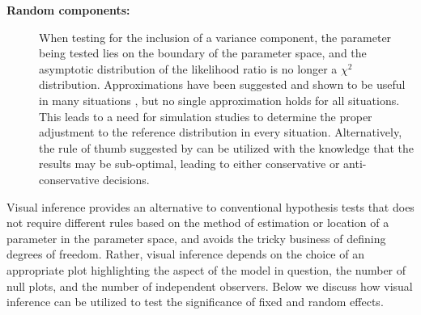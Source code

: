 \documentclass[12pt]{article} %
\newcommand{\alnote}[1]{\todo[inline,color=green!40]{#1}} %
\newcommand{\hhnote}[1]{\todo[inline,color=orange!40]{#1}}
\begin{document}
\begin{description}
%
\item[\bf Random components: ] When testing for the inclusion of a variance component, the parameter being tested lies on the boundary of the parameter space, and the asymptotic distribution of the likelihood ratio is no longer a $\chi^2$ distribution. Approximations have been suggested and shown to be useful in many situations \citep{Stram:1994wd, Morrell:1998ua}, but no single approximation holds for all situations. This leads to a need for simulation studies to determine the proper adjustment to the reference distribution in every situation. Alternatively, the rule of thumb suggested by \citeauthor{Stram:1994wd} can be utilized with the knowledge that the results may be sub-optimal, leading to either conservative or anti-conservative decisions. 
\end{description}


Visual inference provides an alternative to conventional hypothesis tests that does not require different rules based on the method of estimation or location of a parameter in the parameter space, and avoids the tricky business of defining degrees of freedom. Rather, visual inference depends on the choice of an appropriate plot highlighting the aspect of the model in question, the number of null plots, and the number of independent observers. Below we discuss how visual inference can be utilized to test the significance of fixed and random effects.
\end{document}

